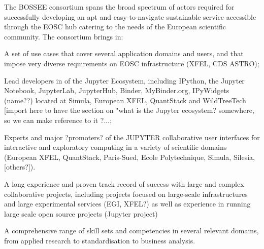 


The BOSSEE consortium spans the broad spectrum of actors required for successfully developing an apt and easy-to-navigate sustainable service accessible through the EOSC hub catering to the needs of the European scientific community. The consortium brings in:
\begin{compactitem}
\item A set of use cases that cover several application domains and users, and that impose very diverse requirements on EOSC infrastructure (XFEL, CDS ASTRO);
\item Lead developers in of the Jupyter Ecosystem, including IPython, the Jupyter Notebook, JupyterLab, JupyterHub, Binder, MyBinder.org, IPyWidgets (name??) located at Simula, European XFEL, QuantStack and WildTreeTech [import here to have the section on "what is the Jupyter ecosystem? somewhere, so we can make reference to it ?...;
\item Experts and major ?promoters? of the JUPYTER collaborative user interfaces for interactive and exploratory computing in a variety of scientific domains (European XFEL, QuantStack, Paris-Sued, Ecole Polytechnique, Simula, Silesia, [others?]).
\item A long experience and proven track record of success with large and complex collaborative projects, including projects focused on large-scale infrastructures and large experimental services (EGI, XFEL?) as well as experience in running large scale open source projects (Jupyter project)
\item A comprehensive range of skill sets and competencies in several relevant domains, from applied research to standardisation to business
analysis.
\end{compactitem}



